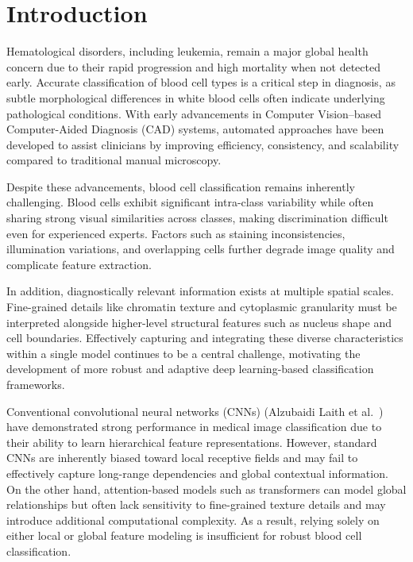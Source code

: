 \documentclass[preprint,12pt]{elsarticle}
\begin{document}
\section{Introduction}

Hematological disorders, including leukemia, remain a major global health concern due to their rapid progression and high mortality when not detected early. Accurate classification of blood cell types is a critical step in diagnosis, as subtle morphological differences in white blood cells often indicate underlying pathological conditions. With early advancements in Computer Vision–based Computer-Aided Diagnosis (CAD) systems, automated approaches have been developed to assist clinicians by improving efficiency, consistency, and scalability compared to traditional manual microscopy.

Despite these advancements, blood cell classification remains inherently challenging. Blood cells exhibit significant intra-class variability while often sharing strong visual similarities across classes, making discrimination difficult even for experienced experts. Factors such as staining inconsistencies, illumination variations, and overlapping cells further degrade image quality and complicate feature extraction.

In addition, diagnostically relevant information exists at multiple spatial scales. Fine-grained details like chromatin texture and cytoplasmic granularity must be interpreted alongside higher-level structural features such as nucleus shape and cell boundaries. Effectively capturing and integrating these diverse characteristics within a single model continues to be a central challenge, motivating the development of more robust and adaptive deep learning-based classification frameworks.


Conventional convolutional neural networks (CNNs) (Alzubaidi Laith et al.~\cite{b37}) have demonstrated strong performance in medical image classification due to their ability to learn hierarchical feature representations. However, standard CNNs are inherently biased toward local receptive fields and may fail to effectively capture long-range dependencies and global contextual information. On the other hand, attention-based models such as transformers can model global relationships but often lack sensitivity to fine-grained texture details and may introduce additional computational complexity. As a result, relying solely on either local or global feature modeling is insufficient for robust blood cell classification.
\end{document}
